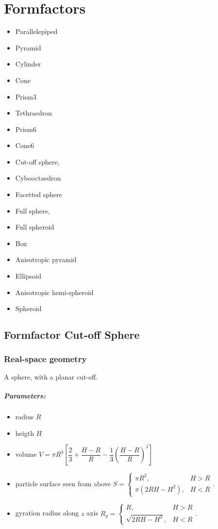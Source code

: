 \chapter{Formfactors}

\begin{itemize}
\item Parallelepiped
\item Pyramid
\item Cylinder
\item Cone
\item Prism3
\item Tethraedron
\item Prism6
\item Cone6
\item Cut-off sphere,  
\item Cybooctaedron
\item Facetted sphere  
\item Full sphere,  
\item Full spheroid 
\item Box
\item Anisotropic pyramid
\item Ellipsoid
\item Anisotropic hemi-spheroid
\item Spheroid
\end{itemize}

\newpage
\section{Formfactor Cut-off Sphere}
\subsection{Real-space geometry}

A sphere, with a planar cut-off. 
\par
\paragraph{Parameters:}
\begin{itemize}
\item radius $R$
\item heigth $H$
\item volume $V=\pi R^3 \left[\dfrac{2}{3} + \dfrac{H-R}{R} - \dfrac{1}{3}\left(\dfrac{H-R}{R}\right)^3\right]$
\item particle surface seen from above $S = \left\{\begin{array}{ll} \pi R^2, & H > R \\
         \pi\left(2RH-H^2\right), & H < R \end{array}\right. .$
\item gyration radius along $z$ axis $R_g = \left\{\begin{array}{ll}  R, & H > R \\
         \sqrt{2RH-H^2}, & H < R \end{array}\right. .$
\end{itemize}

